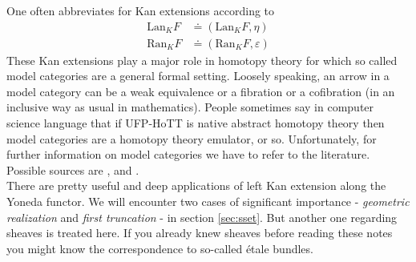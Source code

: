 One often abbreviates for Kan extensions according to
\begin{align*}
  \mathrm{Lan}_{K}F
  &\doteq
  \left(
    \mathrm{Lan}_{K}F,
    \eta
  \right)
  \\
  \mathrm{Ran}_{K}F
  &\doteq
  \left(
    \mathrm{Ran}_{K}F,
    \varepsilon
  \right)
\end{align*}
These Kan extensions play a major role in homotopy theory for which so called {\glqq}model categories{\grqq} are a general formal setting. Loosely speaking, an arrow in a model category can be a weak equivalence or a fibration or a cofibration (in an inclusive way as usual in mathematics). People sometimes say in computer science language that if UFP-HoTT is native abstract homotopy theory then model categories are a homotopy theory emulator, or so. Unfortunately, for further information on model categories we have to refer to the literature. Possible sources are \cite{791993d6}, \cite{70961a11} and \cite{7a40623d}.
\\
There are pretty useful and deep applications of left Kan extension along the Yoneda functor. We will encounter two cases of significant importance - \textit{geometric realization} and \textit{first truncation} - in section \ref{sec:sset}. But another one regarding sheaves is treated here. If you already knew sheaves before reading these notes you might know the correspondence to so-called {\'e}tale bundles.
\\
